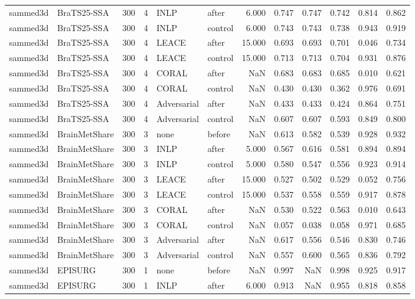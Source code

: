 \begin{tabular}{llrrllrrrrrr}
sammed3d & BraTS25-SSA & 300 & 4 & INLP & after & 6.000 & 0.747 & 0.747 & 0.742 & 0.814 & 0.862 \\
sammed3d & BraTS25-SSA & 300 & 4 & INLP & control & 6.000 & 0.743 & 0.743 & 0.738 & 0.943 & 0.919 \\
sammed3d & BraTS25-SSA & 300 & 4 & LEACE & after & 15.000 & 0.693 & 0.693 & 0.701 & 0.046 & 0.734 \\
sammed3d & BraTS25-SSA & 300 & 4 & LEACE & control & 15.000 & 0.713 & 0.713 & 0.704 & 0.931 & 0.876 \\
sammed3d & BraTS25-SSA & 300 & 4 & CORAL & after & NaN & 0.683 & 0.683 & 0.685 & 0.010 & 0.621 \\
sammed3d & BraTS25-SSA & 300 & 4 & CORAL & control & NaN & 0.430 & 0.430 & 0.362 & 0.976 & 0.691 \\
sammed3d & BraTS25-SSA & 300 & 4 & Adversarial & after & NaN & 0.433 & 0.433 & 0.424 & 0.864 & 0.751 \\
sammed3d & BraTS25-SSA & 300 & 4 & Adversarial & control & NaN & 0.607 & 0.607 & 0.593 & 0.849 & 0.800 \\
sammed3d & BrainMetShare & 300 & 3 & none & before & NaN & 0.613 & 0.582 & 0.539 & 0.928 & 0.932 \\
sammed3d & BrainMetShare & 300 & 3 & INLP & after & 5.000 & 0.567 & 0.616 & 0.581 & 0.894 & 0.894 \\
sammed3d & BrainMetShare & 300 & 3 & INLP & control & 5.000 & 0.580 & 0.547 & 0.556 & 0.923 & 0.914 \\
sammed3d & BrainMetShare & 300 & 3 & LEACE & after & 15.000 & 0.527 & 0.502 & 0.529 & 0.052 & 0.756 \\
sammed3d & BrainMetShare & 300 & 3 & LEACE & control & 15.000 & 0.537 & 0.558 & 0.559 & 0.917 & 0.878 \\
sammed3d & BrainMetShare & 300 & 3 & CORAL & after & NaN & 0.530 & 0.522 & 0.563 & 0.010 & 0.643 \\
sammed3d & BrainMetShare & 300 & 3 & CORAL & control & NaN & 0.057 & 0.038 & 0.058 & 0.971 & 0.685 \\
sammed3d & BrainMetShare & 300 & 3 & Adversarial & after & NaN & 0.617 & 0.556 & 0.546 & 0.830 & 0.746 \\
sammed3d & BrainMetShare & 300 & 3 & Adversarial & control & NaN & 0.557 & 0.600 & 0.565 & 0.836 & 0.792 \\
sammed3d & EPISURG & 300 & 1 & none & before & NaN & 0.997 & NaN & 0.998 & 0.925 & 0.917 \\
sammed3d & EPISURG & 300 & 1 & INLP & after & 6.000 & 0.913 & NaN & 0.955 & 0.818 & 0.858 \\

\end{tabular}
